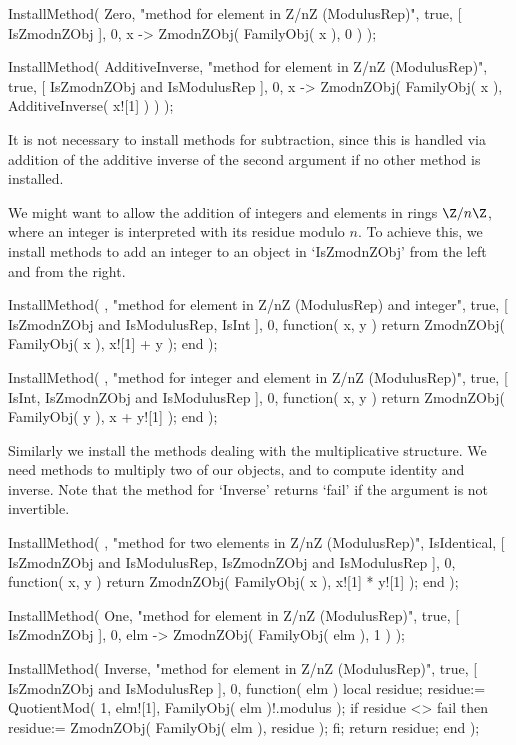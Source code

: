     InstallMethod( Zero,
        "method for element in Z/nZ (ModulusRep)",
        true,
        [ IsZmodnZObj ], 0,
        x -> ZmodnZObj( FamilyObj( x ), 0 ) );

    InstallMethod( AdditiveInverse,
        "method for element in Z/nZ (ModulusRep)",
        true,
        [ IsZmodnZObj and IsModulusRep ], 0,
        x -> ZmodnZObj( FamilyObj( x ), AdditiveInverse( x![1] ) ) );
\endtt

It is not necessary to install methods for subtraction,
since this is handled via addition of the additive inverse of
the second argument if no other method is installed.

We might want to allow the addition of integers and elements in
rings $\Z/n\Z$, where an integer is interpreted with its residue modulo
$n$.
To achieve this, we install methods to add an integer to an object in
`IsZmodnZObj' from the left and from the right.

\begintt
    InstallMethod( \+,
        "method for element in Z/nZ (ModulusRep) and integer",
        true,
        [ IsZmodnZObj and IsModulusRep, IsInt ], 0,
        function( x, y )
        return ZmodnZObj( FamilyObj( x ), x![1] + y );
        end );

    InstallMethod( \+,
        "method for integer and element in Z/nZ (ModulusRep)",
        true,
        [ IsInt, IsZmodnZObj and IsModulusRep ], 0,
        function( x, y )
        return ZmodnZObj( FamilyObj( y ), x + y![1] );
        end );
\endtt

Similarly we install the methods dealing with the multiplicative
structure.
We need methods to multiply two of our objects,
and to compute identity and inverse.
Note that the method for `Inverse' returns `fail' if the argument
is not invertible.

\begintt
    InstallMethod( \*,
        "method for two elements in Z/nZ (ModulusRep)",
        IsIdentical,
        [ IsZmodnZObj and IsModulusRep, IsZmodnZObj and IsModulusRep ],
        0,
        function( x, y )
        return ZmodnZObj( FamilyObj( x ), x![1] * y![1] );
        end );

    InstallMethod( One,
        "method for element in Z/nZ (ModulusRep)",
        true,
        [ IsZmodnZObj ], 0,
        elm -> ZmodnZObj( FamilyObj( elm ), 1 ) );

    InstallMethod( Inverse,
        "method for element in Z/nZ (ModulusRep)",
        true,
        [ IsZmodnZObj and IsModulusRep ], 0,
        function( elm )
        local residue;
        residue:= QuotientMod( 1, elm![1], FamilyObj( elm )!.modulus );
        if residue <> fail then
          residue:= ZmodnZObj( FamilyObj( elm ), residue );
        fi;
        return residue;
        end );
\endtt

